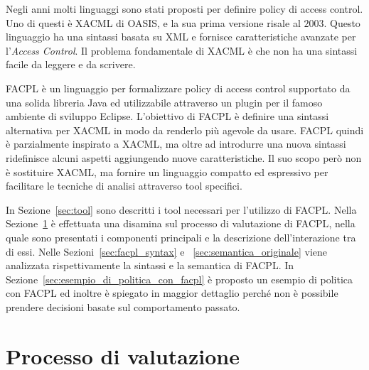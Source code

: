 \label{cap:facpl}
Negli anni molti linguaggi sono stati proposti per definire policy di access control. Uno di questi è \acf{XACML} di OASIS, e la sua prima versione risale al $2003$. Questo linguaggio ha una sintassi basata su \ac{XML} e fornisce caratteristiche avanzate per l'\textit{Access Control}. Il problema fondamentale di \ac{XACML} è che non ha una sintassi facile da leggere e da scrivere. \par
\acf{FACPL} è un linguaggio per formalizzare policy di access control supportato da una solida libreria Java ed utilizzabile attraverso un plugin per il famoso ambiente di sviluppo Eclipse.
L'obiettivo di \ac{FACPL} è definire una sintassi alternativa per \ac{XACML} in modo da renderlo più agevole da usare.
\ac{FACPL} quindi è parzialmente inspirato a \ac{XACML}, ma oltre ad introdurre una nuova sintassi ridefinisce alcuni aspetti aggiungendo nuove caratteristiche. Il suo scopo però non è sostituire \ac{XACML}, ma fornire un linguaggio compatto ed espressivo per facilitare le tecniche di analisi attraverso tool specifici.\par
In Sezione~\ref{sec:tool} sono descritti i tool necessari per l'utilizzo di 
\ac{FACPL}.
Nella Sezione~\ref{sec:valutazione_facpl} è effettuata una disamina sul processo di valutazione di \ac{FACPL}, nella quale sono presentati i componenti principali e la descrizione dell'interazione tra di essi.
Nelle Sezioni~\ref{sec:facpl_syntax} e ~\ref{sec:semantica_originale} viene analizzata rispettivamente la sintassi e la semantica di \ac{FACPL}.
In Sezione~\ref{sec:esempio_di_politica_con_facpl} è proposto un esempio di politica con \ac{FACPL} ed inoltre è spiegato in maggior dettaglio perché non è possibile prendere decisioni basate sul comportamento passato.





\section{Processo di valutazione}
\label{sec:valutazione_facpl}


